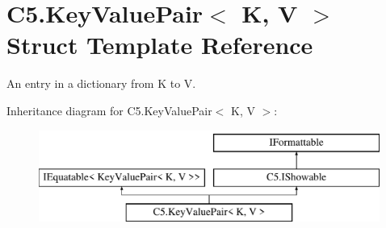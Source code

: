 \hypertarget{struct_c5_1_1_key_value_pair}{}\section{C5.\+Key\+Value\+Pair$<$ K, V $>$ Struct Template Reference}
\label{struct_c5_1_1_key_value_pair}


An entry in a dictionary from K to V.  


Inheritance diagram for C5.\+Key\+Value\+Pair$<$ K, V $>$\+:\begin{figure}[H]
\begin{center}
\leavevmode
\includegraphics[height=3.000000cm]{struct_c5_1_1_key_value_pair}
\end{center}
\end{figure}
